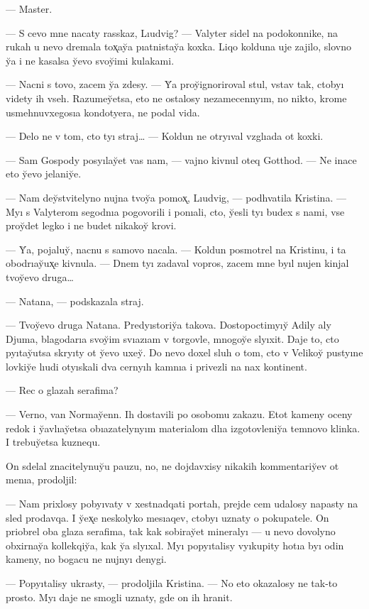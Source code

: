 \documentclass[10pt]{book}
\begin{document}
— Master.

— S cevo mne nacaty rasskaz, Lıudvig? — Valyter sidel na podokonnike, na rukah u nevo dremala tox̨ay̆a pıatnistay̆a koxka. Liqo kolduna uje zajilo, slovno y̆a i ne kasalsa y̆evo svoy̆imi kulakami.

— Nacni s tovo, zacem y̆a zdesy. — Y̆a proy̆ignoriroval stul, vstav tak, ctobyı videty ih vseh. Razumey̆etsa, eto ne ostalosy nezamecennyım, no nikto, krome usmehnuvxegosıa kondotyera, ne podal vida.

— Delo ne v tom, cto tyı straj… — Koldun ne otryıval vzglıada ot koxki.

— Sam Gospody posyılay̆et vas nam, — vajno kivnul oteq Gotthod. — Ne inace eto y̆evo jelaniy̆e.

— Nam dey̆stvitelyno nujna tvoy̆a pomox̨, Lıudvig, — podhvatila Kristina. — Myı s Valyterom segodnıa pogovorili i ponıali, cto, y̆esli tyı budex s nami, vse proy̆det legko i ne budet nikakoy̆ krovi.

— Y̆a, pojaluy̆, nacnu s samovo nacala. — Koldun posmotrel na Kristinu, i ta obodrıay̆ux̨e kivnula. — Dnem tyı zadaval vopros, zacem mne byıl nujen kinjal tvoy̆evo druga…

— Natana, — podskazala straj.

— Tvoy̆evo druga Natana. Predyıstoriy̆a takova. Dostopoctimyıy̆ Adily aly Djuma, blagodarıa svoy̆im svıazıam v torgovle, mnogoy̆e slyıxit. Daje to, cto pyıtay̆utsa skryıty ot y̆evo uxey̆. Do nevo doxel sluh o tom, cto v Velikoy̆ pustyıne lovkiy̆e lıudi otyıskali dva cernyıh kamnıa i privezli na nax kontinent.

— Rec o glazah serafima?

— Verno, van Normay̆enn. Ih dostavili po osobomu zakazu. Etot kameny oceny redok i y̆avlıay̆etsa obıazatelynyım materialom dlıa izgotovleniy̆a temnovo klinka. I trebuy̆etsa kuznequ.

On sdelal znacitelynuy̆u pauzu, no, ne dojdavxisy nikakih kommentariy̆ev ot menıa, prodoljil:

— Nam prixlosy pobyıvaty v xestnadqati portah, prejde cem udalosy napasty na sled prodavqa. I y̆ex̨e neskolyko mesıaqev, ctobyı uznaty o pokupatele. On priobrel oba glaza serafima, tak kak sobiray̆et mineralyı — u nevo dovolyno obxirnay̆a kollekqiy̆a, kak y̆a slyıxal. Myı popyıtalisy vyıkupity hotıa byı odin kameny, no bogacu ne nujnyı denygi.

— Popyıtalisy ukrasty, — prodoljila Kristina. — No eto okazalosy ne tak-to prosto. Myı daje ne smogli uznaty, gde on ih hranit.
\end{document}
